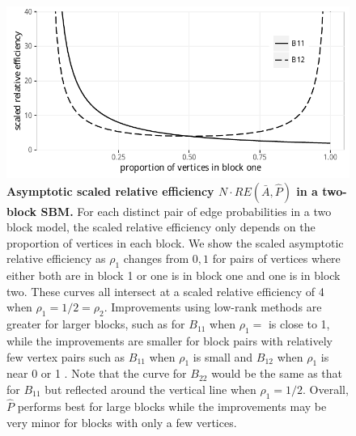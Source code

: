 \documentclass[10pt,letterpaper]{article}
\begin{document}



\begin{figure}[!t]
\centering
\includegraphics[width=1\textwidth]{Rho.pdf}
\caption{{\bf Asymptotic scaled relative efficiency $N\cdot RE(\bar{A},\hat{P})$ in a two-block SBM.}
For each distinct pair of edge probabilities in a two block model, the scaled relative efficiency only depends on the proportion of vertices in each block.
We show the scaled asymptotic relative efficiency as $\rho_1$ changes from $0,1$ for pairs of vertices where either both are in block 1 or one is in block one and one is in block two. 
These curves all intersect at a scaled relative efficiency of 4 when $\rho_1=1/2=\rho_2$.
Improvements using low-rank methods are greater for larger blocks, such as for $B_{11}$ when $\rho_1=$ is close to 1, while the improvements are smaller for block pairs with relatively few vertex pairs such as $B_{11}$ when $\rho_1$ is small and $B_{12}$ when $\rho_1$ is near 0 or 1
.
Note that the curve for $B_{22}$ would be the same as that for $B_{11}$ but reflected around the vertical line when $\rho_1=1/2$.
Overall, $\hat{P}$ performs best for large blocks while the improvements may be very minor for blocks with only a few vertices.
}
\label{fig:RErho}
\end{figure}
\end{document}
